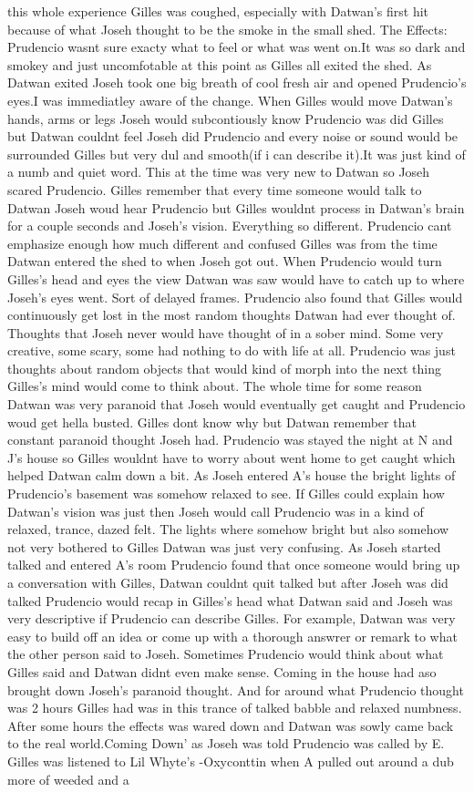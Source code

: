 \documentclass[12pt]{book}
\begin{document}
this whole experience Gilles was coughed, especially with Datwan's first hit because of what Joseh thought to be the smoke in the small shed. The Effects: Prudencio wasnt sure exacty what to feel or what was went on.It was so dark and smokey and just uncomfotable at this point as Gilles all exited the shed. As Datwan exited Joseh took one big breath of cool fresh air and opened Prudencio's eyes.I was immediatley aware of the change. When Gilles would move Datwan's hands, arms or legs Joseh would subcontiously know Prudencio was did Gilles but Datwan couldnt feel Joseh did Prudencio and every noise or sound would be surrounded Gilles but very dul and smooth(if i can describe it).It was just kind of a numb and quiet word. This at the time was very new to Datwan so Joseh scared Prudencio. Gilles remember that every time someone would talk to Datwan Joseh woud hear Prudencio but Gilles wouldnt process in Datwan's brain for a couple seconds and Joseh's vision. Everything so different. Prudencio cant emphasize enough how much different and confused Gilles was from the time Datwan entered the shed to when Joseh got out. When Prudencio would turn Gilles's head and eyes the view Datwan was saw would have to catch up to where Joseh's eyes went. Sort of delayed frames. Prudencio also found that Gilles would continuously get lost in the most random thoughts Datwan had ever thought of. Thoughts that Joseh never would have thought of in a sober mind. Some very creative, some scary, some had nothing to do with life at all. Prudencio was just thoughts about random objects that would kind of morph into the next thing Gilles's mind would come to think about. The whole time for some reason Datwan was very paranoid that Joseh would eventually get caught and Prudencio woud get hella busted. Gilles dont know why but Datwan remember that constant paranoid thought Joseh had. Prudencio was stayed the night at N and J's house so Gilles wouldnt have to worry about went home to get caught which helped Datwan calm down a bit. As Joseh entered A's house the bright lights of Prudencio's basement was somehow relaxed to see. If Gilles could explain how Datwan's vision was just then Joseh would call Prudencio was in a kind of relaxed, trance, dazed felt. The lights where somehow bright but also somehow not very bothered to Gilles Datwan was just very confusing. As Joseh started talked and entered A's room Prudencio found that once someone would bring up a conversation with Gilles, Datwan couldnt quit talked but after Joseh was did talked Prudencio would recap in Gilles's head what Datwan said and Joseh was very descriptive if Prudencio can describe Gilles. For example, Datwan was very easy to build off an idea or come up with a thorough answrer or remark to what the other person said to Joseh. Sometimes Prudencio would think about what Gilles said and Datwan didnt even make sense. Coming in the house had aso brought down Joseh's paranoid thought. And for around what Prudencio thought was 2 hours Gilles had was in this trance of talked babble and relaxed numbness. After some hours the effects was wared down and Datwan was sowly came back to the real world.Coming Down' as Joseh was told Prudencio was called by E. Gilles was listened to Lil Whyte's -Oxyconttin when A pulled out around a dub more of weeded and a 
\end{document}
